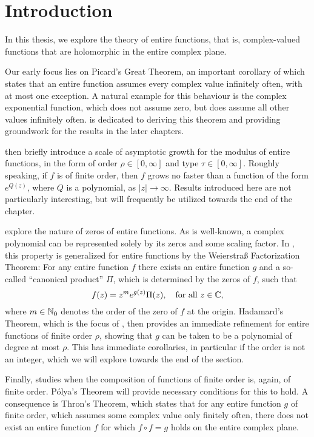 \chapter{Introduction}
\label{ch:introduction}

In this thesis, we explore the theory of entire functions, that is, complex-valued functions that are holomorphic in the entire complex plane.

Our early focus lies on Picard's Great Theorem, an important corollary of which states that an entire function assumes every complex value infinitely often, with at most one exception. A natural example for this behaviour is the complex exponential function, which does not assume zero, but does assume all other values infinitely often.  is dedicated to deriving this theorem and providing groundwork for the results in the later chapters.

 then briefly introduce a scale of asymptotic growth for the modulus of entire functions, in the form of order $\rho \in [0, \infty]$ and type $\tau \in [0, \infty]$. Roughly speaking, if $f$ is of finite order, then $f$ grows no faster than a function of the form $e^{Q(z)}$, where $Q$ is a polynomial, as $\vert z \vert \to \infty$. Results introduced here are not particularly interesting, but will frequently be utilized towards the end of the chapter.

 explore the nature of zeros of entire functions. As is well-known, a complex polynomial can be represented solely by its zeros and some scaling factor. In , this property is generalized for entire functions by the Weierstraß Factorization Theorem: For any entire function $f$ there exists an entire function $g$ and a so-called ``canonical product'' $\Pi$, which is determined by the zeros of $f$, such that
$$ f(z) = z^m e^{g(z)} \Pi(z), \quad \textrm{for all } z \in \mathbb{C}, $$
where $m \in \mathbb{N}_0$ denotes the order of the zero of $f$ at the origin. Hadamard's Theorem, which is the focus of , then provides an immediate refinement for entire functions of finite order $\rho $, showing that $g$ can be taken to be a polynomial of degree at most $\rho$. This has immediate corollaries, in particular if the order is not an integer, which we will explore towards the end of the section.

Finally,  studies when the composition of functions of finite order is, again, of finite order. Pólya's Theorem will provide necessary conditions for this to hold. A consequence is Thron's Theorem, which states that for any entire function $g$ of finite order, which assumes some complex value only finitely often, there does not exist an entire function $f$ for which $f \circ f = g$ holds on the entire complex plane.

